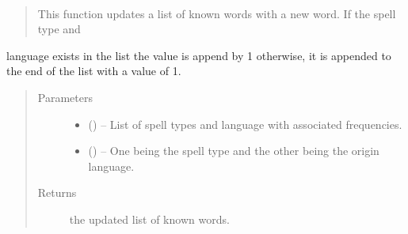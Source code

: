 \documentclass[letterpaper,10pt,english]{sphinxmanual}
\begin{document}
\begin{fulllineitems}
\label{\detokenize{code:hp_spells.checkStoredWords}}~\begin{quote}

This function updates a list of known words with a new word. If the spell type and
\end{quote}

language exists in the list the value is append by 1 otherwise, it is appended to 
the end of the list with a value of 1.
\begin{quote}\begin{description}
\item[{Parameters}] \leavevmode\begin{itemize}
\item {} 
 (\sphinxstyleliteralemphasis{}\sphinxstyleliteralemphasis{{[}}\sphinxstyleliteralemphasis{}\sphinxstyleliteralemphasis{{[}}\sphinxstyleliteralemphasis{}\sphinxstyleliteralemphasis{{[}}\sphinxstyleliteralemphasis{, }\sphinxstyleliteralemphasis{{]}}\sphinxstyleliteralemphasis{}\sphinxstyleliteralemphasis{, }\sphinxstyleliteralemphasis{{]}}\sphinxstyleliteralemphasis{{]}}\sphinxstyleliteralemphasis{}) -- List of spell types and language with associated frequencies.

\item {} 
 () -- One being the spell type and the other being the origin language.

\end{itemize}

\item[{Returns}] \leavevmode
the updated list of known words.

\end{description}\end{quote}

\end{fulllineitems}

\end{document}
